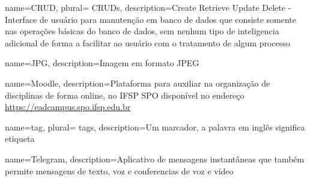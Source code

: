  {
    name=CRUD,
    plural= {CRUDs},
    description={Create Retrieve Update Delete - Interface de usuário para manutenção em banco de dados que consiste somente nas operações básicas do banco de dados, sem nenhum tipo de inteligencia adicional de forma a facilitar ao usuário com o tratamento de algum processo}
}

 {
    name=JPG,
    description={Imagem em formato JPEG}
}

 {
    name=Moodle,
    description={Plataforma para auxiliar na organização de disciplinas de forma online, no IFSP SPO disponível no endereço \url{https://eadcampus.spo.ifsp.edu.br}}
}


 {
    name=tag,
    plural= {tags},
    description={Um marcador, a palavra em inglês significa etiqueta}
}
                
 {
    name=Telegram,
    description={Aplicativo de mensagens instantâneas que também permite mensagens de texto, voz e conferencias de voz e vídeo}
}
